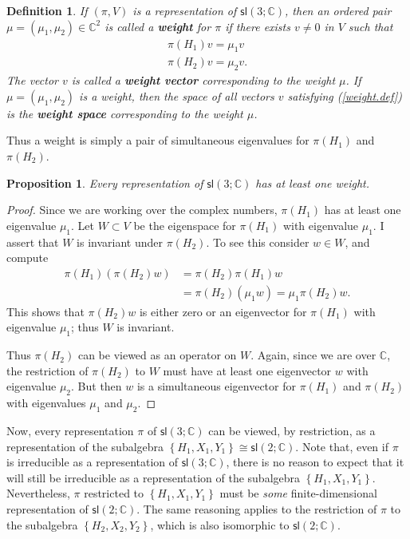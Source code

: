\documentclass{amsbook}
\theoremstyle{plain}
\newtheorem{definition}[theorem]{Definition}
\newtheorem{proposition}[theorem]{Proposition}
\numberwithin{equation}{chapter}
\numberwithin{theorem}{chapter}
\begin{document}
\begin{definition}
If $\left(  \pi,V\right)  $ is a representation of $\mathsf{sl}\left(
3;\mathbb{C}\right)  $, then an ordered pair $\mu=\left(  \mu_{1},\mu
_{2}\right)  \in\mathbb{C}^{2}$ is called a \textbf{weight} for $\pi$ if there
exists $v\neq0$ in $V$ such that
\begin{align}
\pi(H_{1})v=\mu_{1}v\nonumber\\
\pi(H_{2})v=\mu_{2}v\text{.}\label{weight.def}%
\end{align}
The vector $v$ is called a \textbf{weight vector} corresponding to the weight
$\mu$. If $\mu=\left(  \mu_{1},\mu_{2}\right)  $ is a weight, then the space
of all vectors $v$ satisfying (\ref{weight.def}) is the \textbf{weight space}
corresponding to the weight $\mu$.
\end{definition}

Thus a weight is simply a pair of simultaneous eigenvalues for $\pi(H_{1})$
and $\pi(H_{2})$.

\begin{proposition}
\label{weight.exist}Every representation of $\mathsf{sl}\left(  3;\mathbb{C}%
\right)  $ has at least one weight.
\end{proposition}

\begin{proof}
Since we are working over the complex numbers, $\pi(H_{1})$ has at least one
eigenvalue $\mu_{1}$. Let $W\subset V$ be the eigenspace for $\pi(H_{1})$ with
eigenvalue $\mu_{1}$. I assert that $W$ is invariant under $\pi(H_{2})$. To
see this consider $w\in W$, and compute
\begin{align*}
\pi(H_{1})\left(  \pi(H_{2})w\right)    & =\pi(H_{2})\pi(H_{1})w\\
& =\pi(H_{2})\left(  \mu_{1}w\right)  =\mu_{1}\pi(H_{2})w\text{.}%
\end{align*}
This shows that $\pi(H_{2})w$ is either zero or an eigenvector for $\pi
(H_{1})$ with eigenvalue $\mu_{1}$; thus $W$ is invariant.

Thus $\pi(H_{2})$ can be viewed as an operator on $W$. Again, since we are
over $\mathbb{C}$, the restriction of $\pi(H_{2})$ to $W$ must have at least
one eigenvector $w$ with eigenvalue $\mu_{2}$. But then $w$ is a simultaneous
eigenvector for $\pi(H_{1})$ and $\pi(H_{2})$ with eigenvalues $\mu_{1}$ and
$\mu_{2}$.
\end{proof}

Now, every representation $\pi$ of $\mathsf{sl}\left(  3;\mathbb{C}\right)  $
can be viewed, by restriction, as a representation of the subalgebra $\left\{
H_{1},X_{1},Y_{1}\right\}  \cong\mathsf{sl}(2;\mathbb{C})$. Note that, even if
$\pi$ is irreducible as a representation of $\mathsf{sl}\left(  3;\mathbb{C}%
\right)  $, there is no reason to expect that it will still be irreducible as
a representation of the subalgebra $\left\{  H_{1},X_{1},Y_{1}\right\}  $.
Nevertheless, $\pi$ restricted to $\left\{  H_{1},X_{1},Y_{1}\right\}  $ must
be \textit{some} finite-dimensional representation of $\mathsf{sl}%
(2;\mathbb{C})$. The same reasoning applies to the restriction of $\pi$ to the
subalgebra $\left\{  H_{2},X_{2},Y_{2}\right\}  $, which is also isomorphic to
$\mathsf{sl}(2;\mathbb{C})$.
\end{document}

